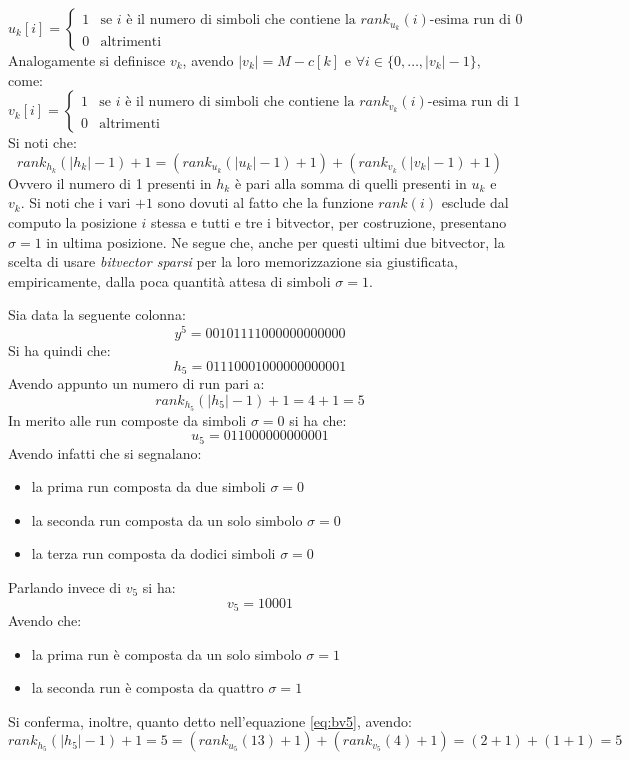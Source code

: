 \begin{equation}
  \label{eq:bv3}
  u_k[i]=
  \begin{cases}
    1&\mbox{se }i \mbox{ è il numero di simboli che contiene la
    }rank_{u_k}(i)\mbox{-esima run di 0}\\
    0&\mbox{altrimenti}
  \end{cases}
\end{equation}
Analogamente si definisce $v_k$, avendo $|v_k|=M-c[k]$ e $\forall
i\in\{0,\ldots,|v_k|-1\}$, come: 
\begin{equation}
  \label{eq:bv4}
  v_k[i]=
  \begin{cases}
    1&\mbox{se }i \mbox{ è il numero di simboli che contiene la
    }rank_{v_k}(i)\mbox{-esima run di 1}\\
    0&\mbox{altrimenti}
  \end{cases}
\end{equation}
Si noti che:
\begin{equation}
  \label{eq:bv5}
  rank_{h_k}(|h_k|-1)+1=(rank_{u_k}(|u_k|-1)+1)+(rank_{v_k}(|v_k|-1)+1)
\end{equation}
Ovvero il numero di 1 presenti in $h_k$ è pari alla somma di quelli presenti in
$u_k$ e $v_k$. Si noti che i vari $+1$ sono
dovuti al fatto che la funzione 
$rank(i)$ esclude dal computo la posizione $i$ stessa e tutti e tre i bitvector,
per costruzione, presentano $\sigma=1$ in ultima posizione. Ne segue che, anche
per questi ultimi due bitvector, la scelta di 
usare \textit{bitvector sparsi} per la loro memorizzazione sia giustificata,
empiricamente, dalla poca quantità attesa di simboli $\sigma=1$.
\begin{esempio}
  \label{es:bv1}
  Sia data la seguente colonna:
  \[y^5=00101111000000000000\]
  Si ha quindi che:
  \[h_5=01110001000000000001\]
  Avendo appunto un numero di run pari a:
  \[rank_{h_5}(|h_5|-1)+1=4+1=5\]
  In merito alle run composte da simboli $\sigma=0$ si ha che:
  \[u_5=011000000000001\]
  Avendo infatti che si segnalano:
  \begin{itemize}
    \item la prima run composta da due simboli $\sigma=0$
    \item la seconda run composta da un solo simbolo $\sigma=0$
    \item la terza run composta da dodici simboli $\sigma=0$
  \end{itemize}
  Parlando invece di $v_5$ si ha:
  \[v_5=10001\]
  Avendo che:
  \begin{itemize}
    \item la prima run è composta da un solo simbolo $\sigma=1$
    \item la seconda run è composta da quattro $\sigma=1$
  \end{itemize}
  Si conferma, inoltre, quanto detto nell'equazione \ref{eq:bv5}, avendo:
  \[rank_{h_5}(|h_5|-1)+1=5 = (rank_{u_5}(13)+1)+(rank_{v_5}(4)+1)=(2+1)+(1+1)=5\]
\end{esempio}
